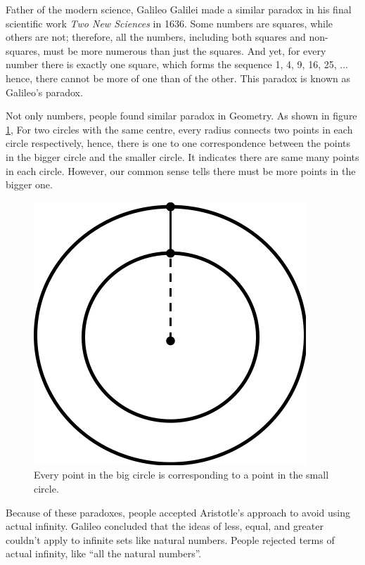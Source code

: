 \documentclass{article}
\begin{document}
Father of the modern science, Galileo Galilei made a similar paradox in his final scientific work {\em Two New Sciences} in 1636. Some numbers are squares, while others are not; therefore, all the numbers, including both squares and non-squares, must be more numerous than just the squares. And yet, for every number there is exactly one square, which forms the sequence 1, 4, 9, 16, 25, ... hence, there cannot be more of one than of the other. This paradox is known as Galileo's paradox.

Not only numbers, people found similar paradox in Geometry. As shown in figure \ref{fig:circles-paradox}, For two circles with the same centre, every radius connects two points in each circle respectively, hence, there is one to one correspondence between the points in the bigger circle and the smaller circle. It indicates there are same many points in each circle. However, our common sense tells there must be more points in the bigger one.

\begin{figure}[htbp]
 \centering
 \includegraphics[scale=0.5]{img/circles-paradox.png}
 \caption{Every point in the big circle is corresponding to a point in the small circle.}
 \label{fig:circles-paradox}
\end{figure}

Because of these paradoxes, people accepted Aristotle's approach to avoid using actual infinity. Galileo concluded that the ideas of less, equal, and greater couldn't apply to infinite sets like natural numbers. People rejected terms of actual infinity, like ``all the natural numbers''.
\end{document}
